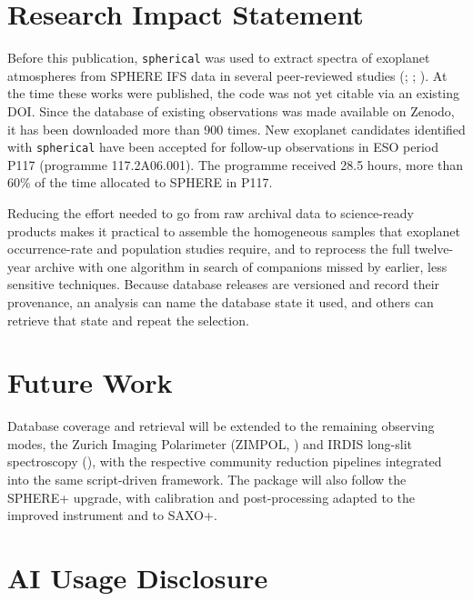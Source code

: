 \documentclass[
]{article}
\begin{document}
\section{Research Impact Statement}\label{research-impact-statement}

Before this publication, \texttt{spherical} was used to extract spectra
of exoplanet atmospheres from SPHERE IFS data in several peer-reviewed
studies (;
;
). At the time these
works were published, the code was not yet citable via an existing DOI.
Since the database of existing observations was made available on
Zenodo, it has been downloaded more than 900 times. New exoplanet
candidates identified with \texttt{spherical} have been accepted for
follow-up observations in ESO period P117 (programme 117.2A06.001). The
programme received 28.5 hours, more than 60\% of the time allocated to
SPHERE in P117.

Reducing the effort needed to go from raw archival data to science-ready
products makes it practical to assemble the homogeneous samples that
exoplanet occurrence-rate and population studies require, and to
reprocess the full twelve-year archive with one algorithm in search of
companions missed by earlier, less sensitive techniques. Because
database releases are versioned and record their provenance, an analysis
can name the database state it used, and others can retrieve that state
and repeat the selection.

\section{Future Work}\label{future-work}

Database coverage and retrieval will be extended to the remaining
observing modes, the Zurich Imaging Polarimeter (ZIMPOL,
) and IRDIS long-slit
spectroscopy (), with the
respective community reduction pipelines integrated into the same
script-driven framework. The package will also follow the SPHERE+
upgrade, with calibration and post-processing adapted to the improved
instrument and to SAXO+.

\section{AI Usage Disclosure}\label{ai-usage-disclosure}
\end{document}
